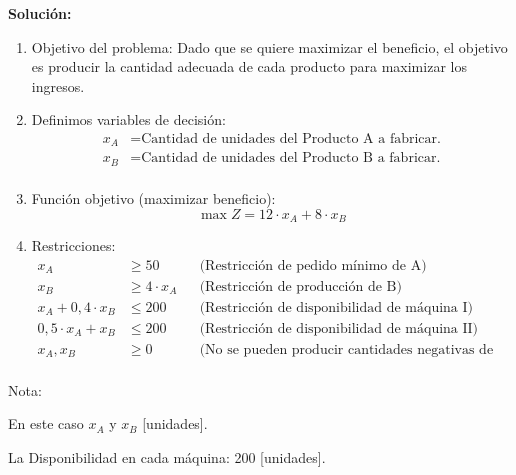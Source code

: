 \documentclass[../main.tex]{subfiles}
\begin{document}
\begin{exercise}
            \textbf{Solución:}
            \begin{enumerate}
                \item Objetivo del problema: Dado que se quiere maximizar el beneficio, el objetivo es producir la cantidad adecuada de cada producto para maximizar los ingresos.
                \item Definimos variables de decisión:
                    \begin{equation}
                        \begin{split}
                            x_A &= \text{Cantidad de unidades del Producto A a fabricar.} \\
                            x_B &= \text{Cantidad de unidades del Producto B a fabricar.} \\
                        \end{split}
                    \end{equation}
                \item Función objetivo (maximizar beneficio):
                    \begin{equation}
                        \max Z = 12 \cdot x_A + 8 \cdot x_B
                    \end{equation}
                \item Restricciones:
                    \begin{equation}
                        \begin{aligned}
                            x_A &\geq 50 && \text{(Restricción de pedido mínimo de A)} \\
                            x_B &\geq 4 \cdot x_A && \text{(Restricción de producción de B)}\\
                            x_A + 0,4 \cdot x_B &\leq 200 && \text{(Restricción de disponibilidad de máquina I)}\\
                            0,5 \cdot x_A + x_B &\leq 200 && \text{(Restricción de disponibilidad de máquina II)}\\
                            x_A, x_B & \geq 0 && \text{(No se pueden producir cantidades negativas de productos)}\\
                        \end{aligned}
                    \end{equation}
            \end{enumerate}
            
            Nota: 
            
            En este caso $x_A$ y $x_B$ [unidades].

            La Disponibilidad en cada máquina: 200 [unidades].
        \end{exercise}
\end{document}
